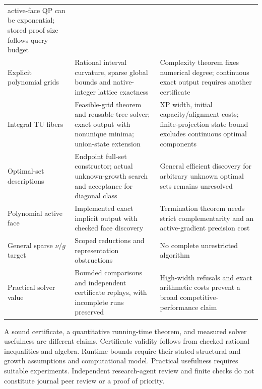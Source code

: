 \begin{longtable}{@{}>{\raggedright\arraybackslash}p{}
>{\raggedright\arraybackslash}p{}
>{\raggedright\arraybackslash}p{}@{}}
active-face QP can be exponential; stored proof size follows query budget \\
Explicit polynomial grids & Rational interval curvature, sparse global
bounds and native-integer lattice exactness & Complexity theorem fixes
numerical degree; continuous exact output requires another certificate \\
Integral TU fibers & Feasible-grid theorem and reusable tree solver;
exact output with nonunique minima; union-state extension & XP width,
initial capacity/alignment costs; finite-projection state bound excludes
continuous optimal components \\
Optimal-set descriptions & Endpoint full-set constructor;
actual unknown-growth search and acceptance for diagonal class &
General efficient discovery for arbitrary unknown optimal sets remains
unresolved \\
Polynomial active face & Implemented exact implicit output with checked
face discovery & Termination theorem needs strict complementarity and an active-gradient
precision cost \\
General sparse $\nu/g$ target & Scoped reductions and
representation obstructions & No complete unrestricted algorithm \\
Practical solver value & Bounded comparisons and independent certificate
replays, with incomplete runs preserved & High-width refusals and exact
arithmetic costs prevent a broad competitive-performance claim \\
\bottomrule
\end{longtable}

A sound certificate, a quantitative running-time theorem, and measured
solver usefulness are different claims. Certificate validity follows from
checked rational inequalities and algebra. Runtime bounds require their
stated structural and growth assumptions and computational model.
Practical usefulness requires suitable experiments. Independent
research-agent review and finite checks do not constitute journal peer
review or a proof of priority.

